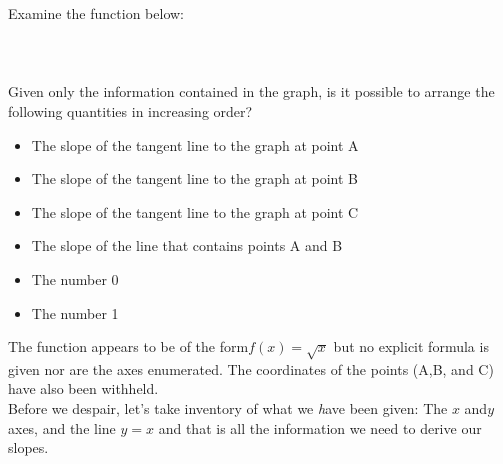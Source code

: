 \documentclass{article}
\begin{document}
\begin{enumerate}
Examine the function below:\\
\\
\\
%
\\Given only the information contained in the graph, is it possible to arrange the following quantities in increasing order? 
%
\begin{itemize}
%
	\item The slope of the tangent line to the graph at point A
	\item The slope of the tangent line to the graph at point B
	\item The slope of the tangent line to the graph at point C
	\item The slope of the line that contains points A and B
	\item The number 0
	\item The number 1
%	
\end{itemize}
The function appears to be of the form$f(x)= \sqrt{x}$ but no explicit formula is given nor are the axes enumerated. The coordinates of the points (A,B, and C) have also been withheld.  \\

Before we despair, let's take inventory of what we \emph have been given: The $x$ and$ y$ axes, and the line {\color{red}$y = x$} and that is all the information we need to derive our slopes. \\


\end{enumerate}
\end{document}
